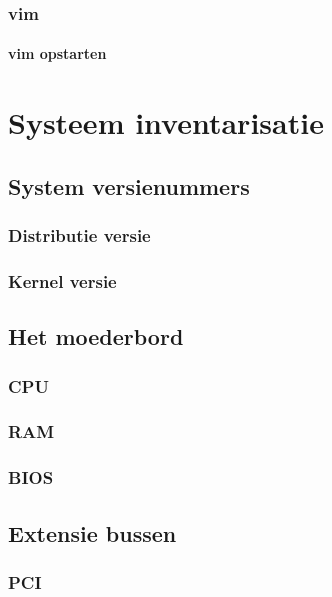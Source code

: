 \documentclass[a4paper,12pt,twoside,openright,titlepage]{book}
\begin{document}
\subsection{vim}

\subsubsection{vim opstarten}






\chapter{Systeem inventarisatie}

\section{System versienummers}

\subsection{Distributie versie}

\subsection{Kernel versie}

\section{Het moederbord}
\subsection{CPU}

\subsection{RAM}

\subsection{BIOS}

\section{Extensie bussen}
\subsection{PCI}

\end{document}
